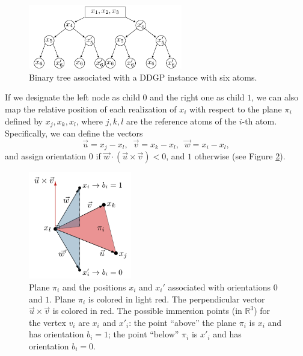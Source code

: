 \documentclass[journal=jacsat,manuscript=article]{achemso}
\begin{document}
\begin{figure}[H]
        \includegraphics[width=0.6\textwidth, clip]{Figures/binary_tree.pdf}
    \caption{\normalsize Binary tree associated with a DDGP instance with six atoms.}
    \label{fig:binary_tree}
\end{figure}

If we designate the left node as child \( 0 \) and the right one as child \( 1 \), we can also map the relative position of each realization of \( x_i \) with respect to the plane \( \pi_i \) defined by \( x_{j},x_{k},x_{l} \), where \( j,k,l \) are the reference atoms of the \( i \)-th atom. Specifically, we can define the vectors $$\vec{u}=x_{j} - x_{l},\;\; \vec{v}=x_{k} - x_{l},\;\; \vec{w}=x_{i} - x_{l},$$ and assign orientation \( 0 \) if \( \vec{w}\cdot(\vec{u}\times \vec{v}) < 0 \), and \( 1 \) otherwise (see Figure \ref{fig:semispace}).

\vspace{-4pt}\begin{figure}[H]
        \includegraphics[width=0.4\textwidth, clip]{Figures/semispace.pdf}
    \caption{\normalsize Plane \( \pi_i \) and the positions \( x_i \) and \( x_i' \) associated with orientations \( 0 \) and \( 1 \). {Plane \( \pi_i \) is colored in light red. The perpendicular vector $\vec{u}\times \vec{v}$ is colored in red. The possible immersion points (in $\mathbb{R}^{3}$) for the vertex $v_{i}$ are $x_{i}$ and $x'_{i}$: the point ``above'' the plane $\pi_{i}$ is $x_{i}$ and has orientation $b_{i}=1$; the point ``below'' $\pi_{i}$ is $x'_{i}$ and has orientation $b_{i}=0$.}}
    \label{fig:semispace}
\end{figure}
\end{document}
